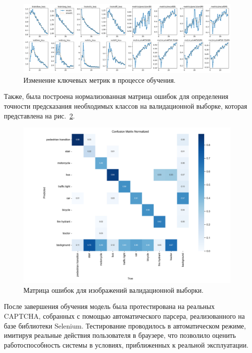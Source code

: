 \begin{figure}[H]
    \centering
    \includegraphics[width=1\linewidth]{imgs/results.png}
    \caption{Изменение ключевых метрик в процессе обучения.}
    \label{fig:metrics}
\end{figure}
\vspace{-0.5cm}

Также, была построена нормализованная матрица ошибок для определения точности предсказания необходимых классов на валидационной выборке, которая представлена на рис.~\ref{fig:confusion}.

\begin{figure}[H]
    \centering
    \includegraphics[width=1\linewidth]{imgs/confusion_matrix_normalized.png}
    \caption{Матрица ошибок для изображений валидационной выборки.}
    \label{fig:confusion}
\end{figure}
\vspace{-0.5cm}

После завершения обучения модель была протестирована на реальных CAPTCHA, собранных с помощью автоматического парсера, реализованного на базе библиотеки Selenium. Тестирование проводилось в автоматическом режиме, имитируя реальные действия пользователя в браузере, что позволило оценить работоспособность системы в условиях, приближенных к реальной эксплуатации.

